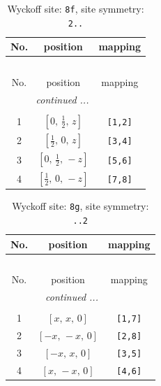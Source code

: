 \documentclass[fleqn,8pt]{jsarticle}
\begin{document}
\renewcommand{\arraystretch}{1.2}
\begin{longtable}{ccc}
\caption{Wyckoff site: {\tt 8f}, site symmetry: {\tt 2..}}
 \\
 \hline \hline
No. & position & mapping \\ \hline \endfirsthead

\multicolumn{2}{l}{\tablename\ \thetable{}} \\
 \hline \hline
No. & position & mapping \\ \hline \endhead

 \hline \hline
\multicolumn{2}{r}{\footnotesize\it continued ...} \\ \endfoot

 \hline \hline
\multicolumn{2}{r}{} \\ \endlastfoot

1 & $\left[ 0,\, \frac{1}{2},\, z \right]$ & {\tt [1,2]} \\ \hline
2 & $\left[ \frac{1}{2},\, 0,\, z \right]$ & {\tt [3,4]} \\ \hline
3 & $\left[ 0,\, \frac{1}{2},\, - z \right]$ & {\tt [5,6]} \\ \hline
4 & $\left[ \frac{1}{2},\, 0,\, - z \right]$ & {\tt [7,8]} \\
\end{longtable}
\renewcommand{\arraystretch}{1.2}
\begin{longtable}{ccc}
\caption{Wyckoff site: {\tt 8g}, site symmetry: {\tt ..2}}
 \\
 \hline \hline
No. & position & mapping \\ \hline \endfirsthead

\multicolumn{2}{l}{\tablename\ \thetable{}} \\
 \hline \hline
No. & position & mapping \\ \hline \endhead

 \hline \hline
\multicolumn{2}{r}{\footnotesize\it continued ...} \\ \endfoot

 \hline \hline
\multicolumn{2}{r}{} \\ \endlastfoot

1 & $\left[ x,\, x,\, 0 \right]$ & {\tt [1,7]} \\ \hline
2 & $\left[ - x,\, - x,\, 0 \right]$ & {\tt [2,8]} \\ \hline
3 & $\left[ - x,\, x,\, 0 \right]$ & {\tt [3,5]} \\ \hline
4 & $\left[ x,\, - x,\, 0 \right]$ & {\tt [4,6]} \\
\end{longtable}
\end{document}
